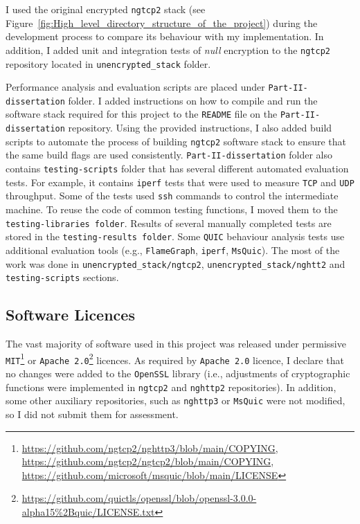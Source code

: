 \documentclass[12pt,a4paper,twoside,openright]{report}
\begin{document}
I used the original encrypted \texttt{ngtcp2} stack (see Figure~\ref{fig:High_level_directory_structure_of_the_project}) during the development process to compare its behaviour with my implementation.
In addition, I added unit and integration tests of \textit{null} encryption to the \texttt{ngtcp2} repository located in \texttt{unencrypted\_stack} folder. 






Performance analysis and evaluation scripts are placed under \texttt{Part-II-dissertation} folder.
I added instructions on how to compile and run the software stack required for this project to the \texttt{README} file on the \texttt{Part-II-dissertation} repository.
Using the provided instructions, I also added build scripts to automate the process of building \texttt{ngtcp2} software stack to ensure that the same build flags are used consistently.
\texttt{Part-II-dissertation} folder also contains \texttt{testing-scripts} folder that has several different automated evaluation tests.
For example, it contains \texttt{iperf} tests that were used to measure \texttt{TCP} and \texttt{UDP} throughput.
Some of the tests used \texttt{ssh} commands to control the intermediate machine.
To reuse the code of common testing functions, I moved them to the \texttt{testing-libraries folder}.
Results of several manually completed tests are stored in the \texttt{testing-results folder}.
Some \texttt{QUIC} behaviour analysis tests use additional evaluation tools (e.g., \texttt{FlameGraph}, \texttt{iperf}, \texttt{MsQuic}).
The most of the work was done in \texttt{unencrypted\_stack/ngtcp2}, \texttt{unencrypted\_stack/nghtt2} and \texttt{testing-scripts} sections.







\subsection{Software Licences} 
The vast majority of software used in this project was released under permissive \texttt{MIT}\footnote{\url{https://github.com/ngtcp2/nghttp3/blob/main/COPYING}, \\  \url{https://github.com/ngtcp2/ngtcp2/blob/main/COPYING}, \\
\url{https://github.com/microsoft/msquic/blob/main/LICENSE}} or \texttt{Apache 2.0}\footnote{\url{https://github.com/quictls/openssl/blob/openssl-3.0.0-alpha15\%2Bquic/LICENSE.txt}} licences.
As required by \texttt{Apache 2.0} licence, I declare that no changes were added to the \texttt{OpenSSL} library (i.e., adjustments of cryptographic functions were implemented in \texttt{ngtcp2} and \texttt{nghttp2} repositories).
In addition, some other auxiliary repositories, such as \texttt{nghttp3} or \texttt{MsQuic} were not modified, so I did not submit them for assessment.
\end{document}

